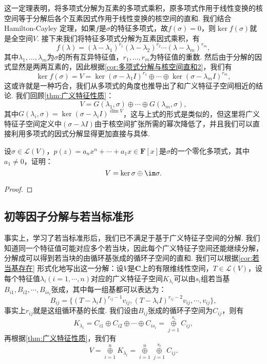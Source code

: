 这一定理表明，将多项式分解为互素的多项式乘积，原多项式作用于线性变换的核空间等于分解后各个互素因式作用于线性变换的核空间的直和. 我们结合 Hamilton-Cayley 定理，如果$f$是$\sigma$的特征多项式，故$f(\sigma)=0$，则$\ker f(\sigma)$就是全空间$V$. 接下来我们将特征多项式分解为互素因式乘积，有
\[f(\lambda)=(\lambda-\lambda_1)^{r_1}(\lambda-\lambda_2)^{r_2}\cdots(\lambda-\lambda_m)^{r_m},\]
其中$\lambda_1,\ldots,\lambda_m$为$\sigma$的所有互异特征值，$r_1,\ldots,r_m$为特征值的重数. 然后由于分解的因式显然是两两互素的，因此根据\autoref{cor:多项式分解与核空间直和2}，我们有
\[\ker f(\sigma)=V=\ker (\sigma-\lambda_1I)^{r_1}\oplus\cdots\oplus\ker (\sigma-\lambda_mI)^{r_m},\]
这或许就是一种巧合，我们从多项式的角度也推导出了和广义特征子空间相近的结论. 我们回顾\autoref{thm:广义特征性质}：
\[V=G(\lambda_1,\sigma)\oplus\cdots\oplus G(\lambda_m,\sigma),\]
其中$G(\lambda_i,\sigma)=\ker (\sigma-\lambda_iI)^{\dim V}$，这与上式的形式是类似的，但这里将广义特征子空间定义中$(\sigma-\lambda I)$由于核空间扩张所需的幂次降低了，并且我们可以直接利用多项式的因式分解显得更加直接与具体.
\begin{example}{}{}
    设$\sigma\in \mathcal{L}(V)$，$p(z)=a_nx^n+\cdots+a_1x\in\mathbf{F}[x]$是$\sigma$的一个零化多项式，其中$a_1\neq 0$，证明：
    \[V=\ker \sigma\oplus\im\sigma.\]
\end{example}

\begin{proof}

\end{proof}

\subsection{初等因子分解与若当标准形}
事实上，学习了若当标准形后，我们已不满足于基于广义特征子空间的分解. 我们知道同一个特征值可能对应多个若当块，因此每个广义特征子空间还能继续分解，分解成可以得到若当块的由循环基张成的循环子空间的直和. 我们可以根据\autoref{cor:若当基存在} 形式化地写出这一分解：设$V$是$\mathbf{C}$上的有限维线性空间，$T\in\mathcal{L}(V)$，设每个特征值$\lambda_i(i=1,\cdots,n)$对应的广义特征子空间$K_{\lambda_i}$可以由$s_i$组若当基$B_{i1},B_{i2},\cdots,B_{is_i}$张成，其中每一组基都可以表达为：
\[B_{ij}=\{(T-\lambda_iI)^{r_{ij}-1}v_{ij},(T-\lambda_iI)^{r_{ij}-2}v_{ij},\cdots,v_{ij}\},\]
事实上$r_{ij}$就是这组循环基的长度. 我们设由$B_{ij}$张成的循环子空间为$C_{ij}$，则有
\[K_{\lambda_i}=C_{i1}\oplus C_{i2}\oplus\cdots\oplus C_{is_i}=\mathop{\oplus}\limits_{j=1}^{s_i} C_{ij},\]
再根据\autoref{thm:广义特征性质}，我们有
\begin{equation} \label{eq:19:循环子空间分解}
    V=\mathop{\oplus}\limits_{i=1}^n K_{\lambda_i}=\mathop{\oplus}\limits_{i=1}^n\mathop{\oplus}\limits_{j=1}^{s_i} C_{ij}.
\end{equation}

